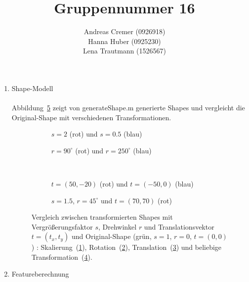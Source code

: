 \documentclass[]{report}
\title{Gruppennummer 16}
\author{Andreas Cremer (0926918)\\Hanna Huber (0925230) \\Lena Trautmann (1526567)}
\newlength\figureheight
\newlength\figurewidth
\begin{document}
	\maketitle
	
	
	\begin{enumerate}
		\item Shape-Modell \\\\
			Abbildung~\ref{fig:trafo} zeigt von generateShape.m generierte Shapes und vergleicht die Original-Shape mit verschiedenen Transformationen.
			\setlength\figureheight{3.5cm}
			\setlength{}
			\begin{figure}
				\begin{subfigure}{0.45\textwidth}
					\centering
					
					\caption{$s=2$ (rot) und $s=0.5$ (blau)}
					\label{fig:s}
				\end{subfigure}
				\qquad
				\begin{subfigure}{0.45\textwidth}
					\centering
					
					\caption{$r=90^\circ$ (rot) und $r=250^\circ$  (blau)}
					\label{fig:r}
				\end{subfigure}	
				\\
				\begin{subfigure}{0.45\textwidth}
					\centering
					
					\caption{$t=(50,-20)$ (rot) und $t=(-50,0)$ (blau)}
					\label{fig:t}
				\end{subfigure}
				\qquad
				\begin{subfigure}{0.45\textwidth}
					\centering
					
					\caption{$s=1.5$, $r=45^\circ$ und $t=(70,70)$ (rot)}
					\label{fig:mix}
				\end{subfigure}	
				\caption{Vergleich zwischen transformierten Shapes mit Vergrößerungsfaktor $s$, Drehwinkel $r$ und Translationsvektor $t=(t_x,t_y)$ und Original-Shape (grün, $s=1$, $r=0$, $t=(0,0)$) : Skalierung~(\ref{fig:s}), Rotation~(\ref{fig:r}), Translation~(\ref{fig:t}) und beliebige Transformation~(\ref{fig:mix}).}
				\label{fig:trafo}
			\end{figure}
			

		\item Featureberechnung
		
		
		

\end{enumerate}
\end{document}

